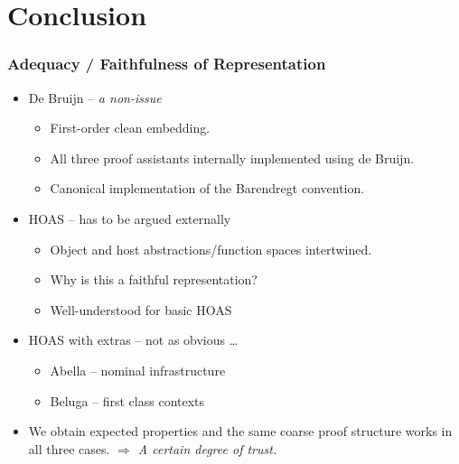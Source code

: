 \documentclass[english,pdftex,dvipsnames,leqno,handout]{beamer}%
\newcommand{\hl}[1]{\emph{\color{sbmcyan} #1}}
\begin{document}
\section*{Conclusion}

\begin{frame}
  \frametitle{Adequacy / Faithfulness of Representation}
  \pause
  \begin{itemize}
  \item De Bruijn -- \hl{a non-issue}
    \begin{itemize}
    \item First-order clean embedding.
    \item All three proof assistants internally implemented using de Bruijn.
    \item Canonical implementation of the Barendregt convention.
    \end{itemize}\pause
  \item HOAS -- has to be argued externally
    \begin{itemize}
    \item Object and host abstractions/function spaces intertwined.
    \item Why is this a faithful representation?
    \item Well-understood for basic HOAS
    \end{itemize}\pause
  \item HOAS with extras -- not as obvious \ldots
    \begin{itemize}
    \item Abella -- nominal infrastructure
    \item Beluga -- first class contexts
    \end{itemize}\pause
  \item We obtain expected properties and the same coarse proof structure works in all three cases. \hl{$\Rightarrow$ A certain degree of trust.}
  \end{itemize}
\end{frame}
\end{document}
